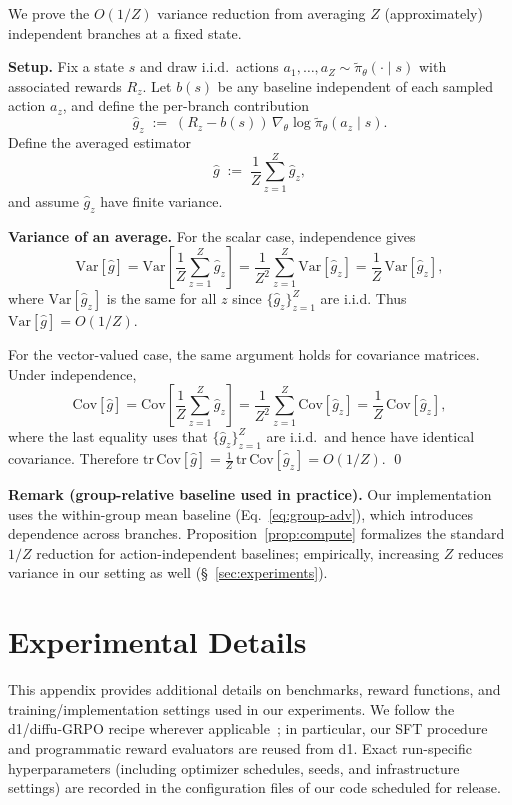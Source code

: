 \documentclass{article}
\theoremstyle{plain}
\theoremstyle{definition}
\theoremstyle{remark}
\begin{document}
We prove the $O(1/Z)$ variance reduction from averaging $Z$ (approximately) independent branches at a fixed state.

\textbf{Setup.}
Fix a state $s$ and draw i.i.d.\ actions $a_1,\dots,a_Z \sim \tilde{\pi}_\theta(\cdot\mid s)$ with associated rewards $R_z$.
Let $b(s)$ be any baseline independent of each sampled action $a_z$, and define the per-branch contribution
\[
  \hat g_z \;:=\; (R_z-b(s))\,\nabla_\theta \log \tilde{\pi}_\theta(a_z\mid s).
\]
Define the averaged estimator
\[
  \hat g \;:=\; \frac{1}{Z}\sum_{z=1}^Z \hat g_z,
\]
and assume $\hat g_z$ have finite variance.

\textbf{Variance of an average.}
For the scalar case, independence gives
\[
\mathrm{Var}[\hat g]
=
\mathrm{Var}\!\left[\frac{1}{Z}\sum_{z=1}^Z \hat g_z\right]
=
\frac{1}{Z^2}\sum_{z=1}^Z \mathrm{Var}[\hat g_z]
=
\frac{1}{Z}\,\mathrm{Var}[\hat g_z],
\]
where $\mathrm{Var}[\hat g_z]$ is the same for all $z$ since $\{\hat g_z\}_{z=1}^Z$ are i.i.d.
Thus $\mathrm{Var}[\hat g]=O(1/Z)$.


For the vector-valued case, the same argument holds for covariance matrices. Under independence,
\[
\mathrm{Cov}[\hat g]
=
\mathrm{Cov}\!\left[\frac{1}{Z}\sum_{z=1}^Z \hat g_z\right]
=
\frac{1}{Z^2}\sum_{z=1}^Z \mathrm{Cov}[\hat g_z]
=
\frac{1}{Z}\,\mathrm{Cov}[\hat g_z],
\]
where the last equality uses that $\{\hat g_z\}_{z=1}^Z$ are i.i.d.\ and hence have identical covariance.
Therefore $\mathrm{tr}\,\mathrm{Cov}[\hat g] = \frac{1}{Z}\,\mathrm{tr}\,\mathrm{Cov}[\hat g_z] = O(1/Z)$.
\qed


\textbf{Remark (group-relative baseline used in practice).}
Our implementation uses the within-group mean baseline (Eq.~\ref{eq:group-adv}), which introduces dependence across branches.
Proposition~\ref{prop:compute} formalizes the standard $1/Z$ reduction for action-independent baselines; empirically, increasing $Z$ reduces variance in our setting as well (\S~\ref{sec:experiments}).














\appendix
\section{Experimental Details}
\label{app:exp}

This appendix provides additional details on benchmarks, reward functions, and training/implementation settings used in our experiments. We follow the d1/diffu-GRPO recipe wherever applicable~\citep{zhao2025d1}; in particular, our SFT procedure and programmatic reward evaluators are reused from d1. Exact run-specific hyperparameters (including optimizer schedules, seeds, and infrastructure settings) are recorded in the configuration files of our code scheduled for release.
\end{document}
